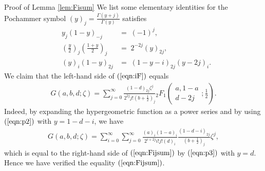 \documentclass[12pt]{article}
\numberwithin{equation}{section}
\newenvironment{proof*}[1]{\noindent\textbf{#1\ }}{\hspace*{\fill}$\Box$\medskip}
\begin{document}
\begin{proof*}{Proof of Lemma \ref{lem:Fisum}}
  We list some elementary identities for the Pochammer symbol $(y)_j =
  \frac{\Gamma (y + j)}{\Gamma (y)}$ satisfies
  \begin{eqnarray}
    & y_j (1 - y)_{- j} & = \; (- 1)^j,  \label{eqn:p1}\\
    & \left( \frac{y}{2} \right)_j \left( \frac{1 + y}{2} \right)_j & = \;
    2^{- 2 j} (y)_{2 j},  \label{eqn:p2}\\
    & (y)_i (1 - y)_{2 j} & = \; (1 - y - i)_{2 j} (y - 2 j)_i . 
    \label{eqn:p3}
  \end{eqnarray}
  We claim that the left-hand side of $(\ref{eqn:iF})$ equals
  \begin{eqnarray}
    & G (a, b, d ; \zeta) = \displaystyle\sum_{j = 0}^{\infty} \frac{(1 - d)_{2 j}
    \zeta^j}{2^{2 j} j! \left( b + \frac{1}{2} \right)_j}{}_2 F_1 \left(
    \begin{array}{c}
      a, 1 - a\\
      d - 2 j
    \end{array} ; \frac{1}{2} \right) . &  \label{eqn:Fijsum}
  \end{eqnarray}
  Indeed, by expanding the hypergeometric function as a power series and by
  using $(\ref{eqn:p2})$ with $y = 1 - d - i$, we have
  \begin{eqnarray}
    & G (a, b, d ; \zeta) = \displaystyle\sum_{i = 0}^{\infty} \displaystyle\sum_{j = 0}^{\infty}
    \frac{(a)_i (1 - a)_i}{2^{i + 2 j} i!j! (d)_i}  \frac{(1 - d - i)_{2
    j}}{\left( b + \frac{1}{2} \right)_j} \zeta^j, &  \nonumber
  \end{eqnarray}
  which is equal to the right-hand side of $(\ref{eqn:Fijsum})$ by
  $(\ref{eqn:p3})$ with $y = d$. Hence we have verified the equality
  $(\ref{eqn:Fijsum})$.
  

\end{proof*}
\end{document}
